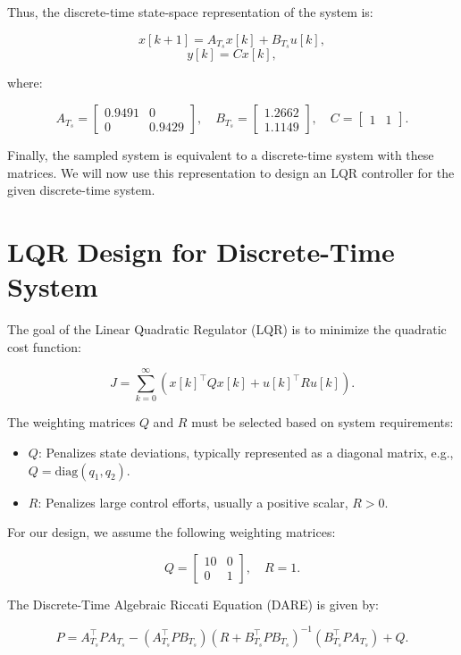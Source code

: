 Thus, the discrete-time state-space representation of the system is:

\[
x[k+1] = A_{T_s} x[k] + B_{T_s} u[k],
\]
\[
y[k] = C x[k],
\]

where:

\[
A_{T_s} = 
\begin{bmatrix}
0.9491 & 0 \\
0 & 0.9429
\end{bmatrix}, \quad
B_{T_s} = 
\begin{bmatrix}
1.2662 \\
1.1149
\end{bmatrix}, \quad
C = 
\begin{bmatrix}
1 & 1
\end{bmatrix}.
\]

Finally, the sampled system is equivalent to a discrete-time system with these matrices. We will now use this representation to design an LQR controller for the given discrete-time system.

\section{LQR Design for Discrete-Time System}

The goal of the Linear Quadratic Regulator (LQR) is to minimize the quadratic cost function:

\[
J = \sum_{k=0}^\infty \left( x[k]^\top Q x[k] + u[k]^\top R u[k] \right).
\]

The weighting matrices \( Q \) and \( R \) must be selected based on system requirements:

\begin{itemize}
    \item \( Q \): Penalizes state deviations, typically represented as a diagonal matrix, e.g., \( Q = \text{diag}(q_1, q_2) \).
    \item \( R \): Penalizes large control efforts, usually a positive scalar, \( R > 0 \).
\end{itemize}

For our design, we assume the following weighting matrices:

\[
Q = \begin{bmatrix}
10 & 0 \\
0 & 1
\end{bmatrix}, \quad R = 1.
\]

The Discrete-Time Algebraic Riccati Equation (DARE) is given by:

\[
P = A_{T_s}^\top P A_{T_s} - \left(A_{T_s}^\top P B_{T_s} \right) 
\left(R + B_{T_s}^\top P B_{T_s} \right)^{-1} 
\left(B_{T_s}^\top P A_{T_s} \right) + Q.
\]

